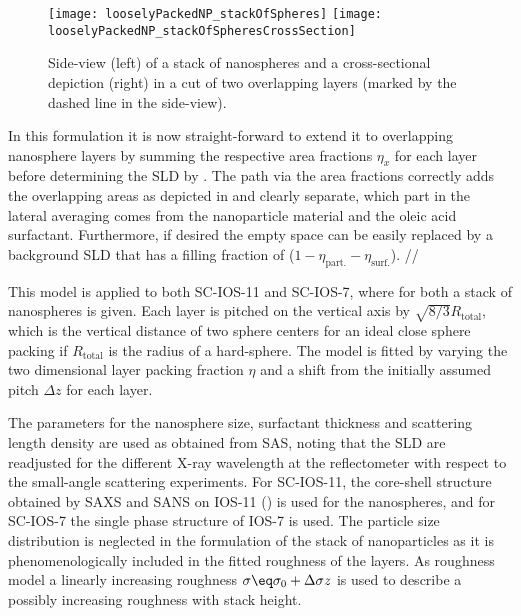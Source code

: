\documentclass[\main/dresen_thesis.tex]{subfiles}
\begin{document}
    \begin{figure}[htbp]
      \centering
      \texttt{[image: looselyPackedNP\_stackOfSpheres]}
      \texttt{[image: looselyPackedNP\_stackOfSpheresCrossSection]}
      \caption{\label{fig:looselyPackedNP:layerCharacterization:sphereStackProfile}Side-view (left) of a stack of nanospheres and a cross-sectional depiction (right) in a cut of two overlapping layers (marked by the dashed line in the side-view).}
    \end{figure}

    In this formulation it is now straight-forward to extend it to overlapping nanosphere layers by summing the respective area fractions $\eta_x$ for each layer before determining the SLD by .
    The path via the area fractions correctly adds the overlapping areas as depicted in  and clearly separate, which part in the lateral averaging comes from the nanoparticle material and the oleic acid surfactant.
    Furthermore, if desired the empty space can be easily replaced by a background SLD that has a filling fraction of ($1 - \eta_\mathrm{part.} - \eta_\mathrm{surf.}$).
    //

    This model is applied to both SC-IOS-11 and SC-IOS-7, where for both a stack of nanospheres is given.
    Each layer is pitched on the vertical axis by $\sqrt{8/3} R_\mathrm{total}$, which is the vertical distance of two sphere centers for an ideal close sphere packing if $R_\mathrm{total}$ is the radius of a hard-sphere.
    The model is fitted by varying the two dimensional layer packing fraction $\eta$ and a shift from the initially assumed pitch $\Delta z$ for each layer.

    The parameters for the nanosphere size, surfactant thickness and scattering length density are used as obtained from SAS, noting that the SLD are readjusted for the different X-ray wavelength at the reflectometer with respect
    to the small-angle scattering experiments.
    For SC-IOS-11, the core-shell structure obtained by SAXS and SANS on IOS-11 () is used for the nanospheres, and for SC-IOS-7 the single phase structure of IOS-7 is used.
    The particle size distribution is neglected in the formulation of the stack of nanoparticles as it is phenomenologically included in the fitted roughness of the layers.
    As roughness model a linearly increasing roughness $\sigma \eq \sigma_0 + \Delta \sigma z$ is used to describe a possibly increasing roughness with stack height.
\end{document}
